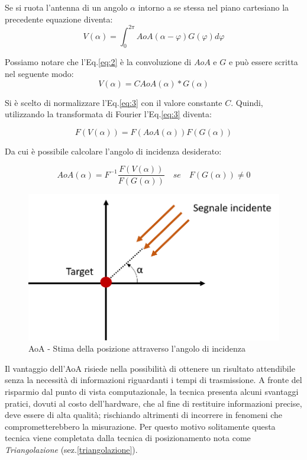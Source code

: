Se si ruota l'antenna di un angolo $\alpha$ intorno a se stessa nel piano cartesiano la precedente equazione diventa:
\begin{equation}
\label{eq:2}
V (\alpha) = \int_{0}^{2\pi} AoA(\alpha-\varphi) G(\varphi)d\varphi 
\end{equation}

Possiamo notare che l'Eq.\ref{eq:2} è la convoluzione di $AoA$ e $G$ e può essere scritta nel seguente modo:
\begin{equation}
\label{eq:3}
V (\alpha) = C AoA(\alpha) * G(\alpha)
\end{equation}

Si è scelto di normalizzare l'Eq.\ref{eq:3} con il valore constante $C$. Quindi, utilizzando la transformata di Fourier l'Eq.\ref{eq:3} diventa:

\begin{equation}
\label{eq:4}
F(V(\alpha)) = F(AoA(\alpha)) F(G(\alpha))
\end{equation}

Da cui è possibile calcolare l'angolo di incidenza desiderato:

\begin{equation}
\label{eq:5}
AoA(\alpha) = F^{-1} \dfrac{F(V(\alpha))}{F(G(\alpha))} \quad se \quad F(G(\alpha))\neq 0
\end{equation}

\begin{figure}[H]  
	\centering 
	\includegraphics[scale=0.4]{ContestoApplicativo/aoa.png}
	\caption{AoA - Stima della posizione attraverso l'angolo di incidenza}
	\label{fig:aoa}
\end{figure}

Il vantaggio dell’AoA risiede nella possibilità di ottenere un risultato attendibile senza la necessità di informazioni riguardanti i tempi di trasmissione. A fronte del risparmio dal punto di vista computazionale, la tecnica presenta alcuni svantaggi pratici, dovuti al costo dell’hardware, che al fine di restituire informazioni precise, deve essere di alta qualità; rischiando altrimenti di incorrere in fenomeni che comprometterebbero la misurazione. Per questo motivo solitamente questa tecnica viene completata dalla tecnica di posizionamento nota come \textit{Triangolazione} (sez.\ref{triangolazione}).


